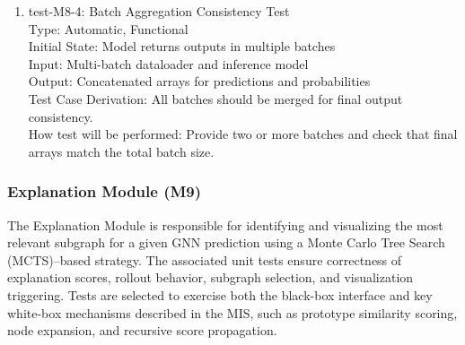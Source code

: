 \documentclass[12pt, titlepage]{article}
\begin{document}
\begin{enumerate}
\item{test-M8-4: Batch Aggregation Consistency Test\\}
Type: Automatic, Functional \\
Initial State: Model returns outputs in multiple batches \\
Input: Multi-batch dataloader and inference model \\
Output: Concatenated arrays for predictions and probabilities \\
Test Case Derivation: All batches should be merged for final output consistency. \\
How test will be performed: Provide two or more batches and check that final arrays match the total batch size.

\end{enumerate}


\subsubsection{Explanation Module (M9)}

The Explanation Module is responsible for identifying and visualizing the most relevant subgraph for a given GNN prediction using a Monte Carlo Tree Search (MCTS)–based strategy. The associated unit tests ensure correctness of explanation scores, rollout behavior, subgraph selection, and visualization triggering. Tests are selected to exercise both the black-box interface and key white-box mechanisms described in the MIS, such as prototype similarity scoring, node expansion, and recursive score propagation.
\end{document}
